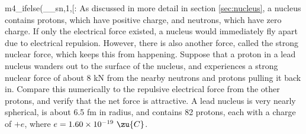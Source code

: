 m4_ifelse(__sn,1,[:%
        As discussed in more detail in section \ref{sec:nucleus}, a nucleus contains
        protons, which have positive charge, and neutrons, which have zero charge.
        If only the electrical force existed, a nucleus would immediately fly apart
        due to electrical repulsion. However, there is also another force, called the
        strong nuclear force, which keeps this from happening.
        Suppose that a proton in a lead nucleus wanders out to
        the surface of the nucleus, and experiences a strong nuclear
        force of about 8 kN from the nearby neutrons and protons
        pulling it back in.  Compare this numerically to the
        repulsive electrical force from the other protons, and
        verify that the net force is attractive.  A lead nucleus is
        very nearly spherical, 
        is about 6.5 fm in radius, and
        contains 82 protons, each with a charge of $+e$, where
        $e=1.60\times10^{-19}\ \zu{C}$.
\answercheck
